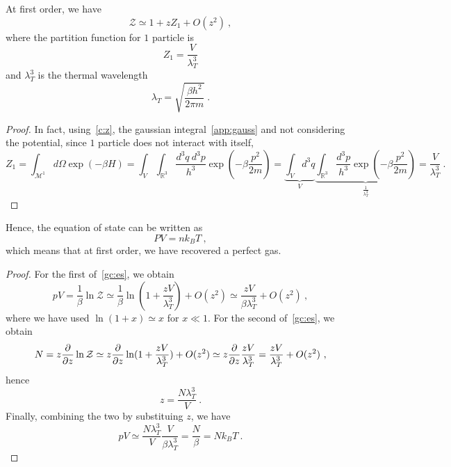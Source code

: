     At first order, we have 
    \begin{equation*}
        \mathcal Z \simeq 1 + z Z_1 + O(z^2) ~,
    \end{equation*}
    where the partition function for $1$ particle is 
    \begin{equation*}
        Z_1 = \frac{V}{\lambda^3_T} 
    \end{equation*}
    and $\lambda_T^3$ is the thermal wavelength
    \begin{equation*}
        \lambda_T = \sqrt{\frac{\beta h^2}{2 \pi m}} ~.
    \end{equation*}
    \begin{proof}
        In fact, using~\eqref{c:z}, the gaussian integral~\eqref{app:gauss} and not considering the potential, since $1$ particle does not interact with itself,
        \begin{equation*}
            Z_1 = \int_{\mathcal M^1} d\Omega \exp(- \beta H) = \int_V \int_{\mathbb R^3} \frac{d^3 q ~d^3 p}{h^3} \exp(- \beta \frac{p^2}{2m}) = \underbrace{\int_V d^3 q}_V \underbrace{\int_{\mathbb R^3} \frac{d^3 p}{h^3} \exp(- \beta \frac{p^2}{2m})}_{\frac{1}{\lambda_T^3}} = \frac{V}{\lambda^3_T} ~.
        \end{equation*}
    \end{proof}
    Hence, the equation of state can be written as 
    \begin{equation*}
         PV = n k_B T ~,
    \end{equation*}
    which means that at first order, we have recovered a perfect gas.
    \begin{proof}
        For the first of~\eqref{gc:es}, we obtain 
        \begin{equation*}
            p V = \frac{1}{\beta} \ln \mathcal Z \simeq \frac{1}{\beta} \ln (1 + \frac{z V}{\lambda_T^3}) + O(z^2) \simeq \frac{z V}{\beta \lambda_T^3} + O(z^2) ~,
        \end{equation*}
        where we have used $\ln (1 + x) \simeq x$ for $x \ll 1$.
        For the second of~\eqref{gc:es}, we obtain 
        \begin{equation*}
            N = z \frac{\partial}{\partial z} \ln \mathcal Z \simeq z \frac{\partial}{\partial z} \ln (1 + \frac{z V}{\lambda_T^3}) + O(z^2) \simeq z \frac{\partial}{\partial z} \frac{z V}{\lambda_T^3} = \frac{z V}{\lambda_T^3} + O(z^2) ~,
        \end{equation*}
        hence 
        \begin{equation*}
            z = \frac{N \lambda_T^3}{V} ~.
        \end{equation*}
        Finally, combining the two by substituing $z$, we have
        \begin{equation*}
            p V \simeq \frac{N \lambda_T^3}{V} \frac{V}{\beta \lambda_T^3} = \frac{N}{\beta} = N k_B T ~.
        \end{equation*}
    \end{proof}


